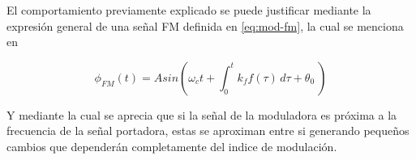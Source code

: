 \documentclass[conference]{IEEEtran}
\begin{document}
	El comportamiento previamente explicado se puede justificar mediante la expresión general de una señal FM definida en \ref{eq:mod-fm}, la cual se menciona en \cite{stremler2006}
	
	\begin{equation}
		\phi_{FM}(t) = Asin( \omega_c t + \int_0^t k_f f(\tau)\, d\tau + \theta_0\ )
		\label{eq:mod-fm}
	\end{equation}
	
	Y mediante la cual se aprecia que si la señal de la moduladora es próxima a la frecuencia de la señal portadora, estas se aproximan entre si generando pequeños cambios que dependerán completamente del indice de modulación.
	
	
	
\end{document}
